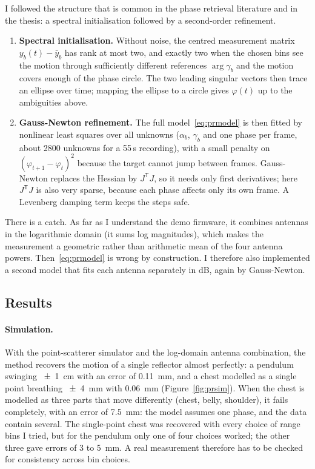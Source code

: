 \documentclass[11pt,a4paper]{article}
\begin{document}
I followed the structure that is common in the phase retrieval literature and in the thesis: a spectral initialisation followed by a second-order refinement.
\begin{enumerate}
\item \textbf{Spectral initialisation.} Without noise, the centred measurement matrix $y_b(t) - \bar y_b$ has rank at most two, and exactly two when the chosen bins see the motion through sufficiently different references $\arg\gamma_b$ and the motion covers enough of the phase circle. The two leading singular vectors then trace an ellipse over time; mapping the ellipse to a circle gives $\varphi(t)$ up to the ambiguities above.
\item \textbf{Gauss-Newton refinement.} The full model~\eqref{eq:prmodel} is then fitted by nonlinear least squares over all unknowns ($\alpha_b$, $\gamma_b$ and one phase per frame, about 2800 unknowns for a 55\,s recording), with a small penalty on $(\varphi_{t+1} - \varphi_t)^2$ because the target cannot jump between frames. Gauss-Newton replaces the Hessian by $J^\mathsf{T} J$, so it needs only first derivatives; here $J^\mathsf{T}J$ is also very sparse, because each phase affects only its own frame. A Levenberg damping term keeps the steps safe.
\end{enumerate}
There is a catch. As far as I understand the demo firmware, it combines antennas in the logarithmic domain (it sums log magnitudes), which makes the measurement a geometric rather than arithmetic mean of the four antenna powers. Then~\eqref{eq:prmodel} is wrong by construction. I therefore also implemented a second model that fits each antenna separately in dB, again by Gauss-Newton.

\subsection{Results}

\paragraph{Simulation.} With the point-scatterer simulator and the log-domain antenna combination, the method recovers the motion of a single reflector almost perfectly: a pendulum swinging \SI{\pm1}{cm} with an error of \SI{0.11}{mm}, and a chest modelled as a single point breathing \SI{\pm4}{mm} with \SI{0.06}{mm} (Figure~\ref{fig:prsim}). When the chest is modelled as three parts that move differently (chest, belly, shoulder), it fails completely, with an error of \SI{7.5}{mm}: the model assumes one phase, and the data contain several. The single-point chest was recovered with every choice of range bins I tried, but for the pendulum only one of four choices worked; the other three gave errors of 3 to \SI{5}{mm}. A real measurement therefore has to be checked for consistency across bin choices.
\end{document}
